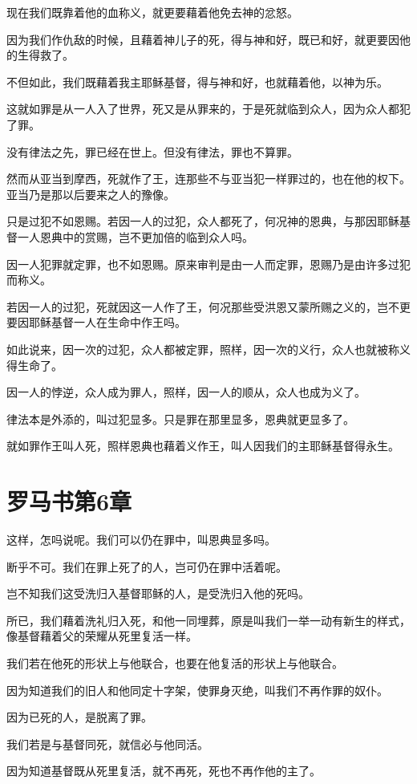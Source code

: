 \documentclass[12pt,oneside]{book}
\begin{document}
现在我们既靠着他的血称义，就更要藉着他免去神的忿怒。

因为我们作仇敌的时候，且藉着神儿子的死，得与神和好，既已和好，就更要因他的生得救了。

不但如此，我们既藉着我主耶稣基督，得与神和好，也就藉着他，以神为乐。

这就如罪是从一人入了世界，死又是从罪来的，于是死就临到众人，因为众人都犯了罪。

没有律法之先，罪已经在世上。但没有律法，罪也不算罪。

然而从亚当到摩西，死就作了王，连那些不与亚当犯一样罪过的，也在他的权下。亚当乃是那以后要来之人的豫像。

只是过犯不如恩赐。若因一人的过犯，众人都死了，何况神的恩典，与那因耶稣基督一人恩典中的赏赐，岂不更加倍的临到众人吗。

因一人犯罪就定罪，也不如恩赐。原来审判是由一人而定罪，恩赐乃是由许多过犯而称义。

若因一人的过犯，死就因这一人作了王，何况那些受洪恩又蒙所赐之义的，岂不更要因耶稣基督一人在生命中作王吗。

如此说来，因一次的过犯，众人都被定罪，照样，因一次的义行，众人也就被称义得生命了。

因一人的悖逆，众人成为罪人，照样，因一人的顺从，众人也成为义了。

律法本是外添的，叫过犯显多。只是罪在那里显多，恩典就更显多了。

就如罪作王叫人死，照样恩典也藉着义作王，叫人因我们的主耶稣基督得永生。

\chapter{罗马书第6章}
这样，怎吗说呢。我们可以仍在罪中，叫恩典显多吗。

断乎不可。我们在罪上死了的人，岂可仍在罪中活着呢。

岂不知我们这受洗归入基督耶稣的人，是受洗归入他的死吗。

所已，我们藉着洗礼归入死，和他一同埋葬，原是叫我们一举一动有新生的样式，像基督藉着父的荣耀从死里复活一样。

我们若在他死的形状上与他联合，也要在他复活的形状上与他联合。

因为知道我们的旧人和他同定十字架，使罪身灭绝，叫我们不再作罪的奴仆。

因为已死的人，是脱离了罪。

我们若是与基督同死，就信必与他同活。

因为知道基督既从死里复活，就不再死，死也不再作他的主了。
\end{document}
